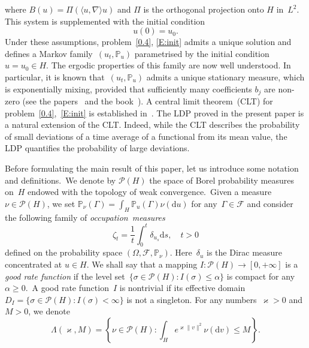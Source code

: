 \documentclass[10pt]{amsart}
\theoremstyle{definition}\newtheorem{defi}[theo]{Definition}\newtheorem{rema}[theo]{Remark}\newtheorem{exam}[theo]{Example}\newtheorem{exem}[theo]{Example}\newtheorem{nota}[theo]{Notation}
\newcommand{\IP}{{\mathbb P}}
\newcommand{\FF}{{\mathcal F}}
\newcommand{\PP}{{\mathcal P}}
\newcommand{\ty}{\infty}
\newcommand{\de}{\delta}
\newcommand{\dd}{\mathrm{d}}
\begin{document}
where $B(u)=\Pi(\langle u,\nabla \rangle u)$ and $\Pi$ is the orthogonal projection onto $H$ in~$L^2$. This system is supplemented with the initial condition
\begin{equation}\label{E:init}
u(0)=u_0.
\end{equation}
Under these assumptions, problem~\eqref{0.4}, \eqref{E:init} admits a unique solution and defines a Markov family~$(u_t,\IP_u)$ parametrised by the initial condition~$u=u_0 \in H$. The ergodic properties of this family are now well understood. In particular, it is known that~$(u_t,\IP_u)$ admits a unique stationary measure, which is exponentially mixing, provided that sufficiently many coefficients $b_j$ are non-zero (see the papers~\cite{FM-1995,KS-cmp2000,EMS-2001, KS-jmpa2002, BKL-2002,HM-2006, odasso-2008} and the book~\cite{KS-book}). A central limit theorem~(CLT) for problem~\eqref{0.4},~\eqref{E:init} is established in~\cite{kuksin-jmpa, shirikyan-ptrf}. The LDP proved in the present paper is a natural extension of the CLT. Indeed, while the CLT describes the probability of small deviations of a time average of a functional from its mean value, the LDP quantifies the probability of large deviations.


Before formulating the main result of this paper, let us introduce some notation and definitions.~We denote by $\PP(H)$ the space of Borel probability measures on~$H$ endowed with the to\-pology of weak convergence.~Given a measure~$\nu\in\PP(H)$, we set $
\IP_\nu(\Gamma)=\int_H\IP_u(\Gamma)\nu(\dd u)$ for any~$\Gamma\in \FF$ and consider the following family of \emph{occupation~measures}
\begin{equation}\label{0.5}
\zeta_t=\frac1t\int_{0}^{t}\delta_{u_s} \dd s,\quad t>0
\end{equation}
defined on the probability space $(\Omega,\FF,\IP_\nu)$. Here~$\de_u$ is the Dirac measure concentrated at $u\in H$. We shall say that a mapping $I : \PP(H) \to [0, +\ty]$ is a \emph{good rate function} if the level set~$\{\sigma\in\PP(H) : I(\sigma) \le \alpha \}$ is compact for any~$\alpha \ge0$.~A good rate function~$I$ is nontrivial if its effective domain $D_I = \{\sigma \in \PP(H) : I(\sigma) < \ty\}$ is not a singleton. For any numbers~$\varkappa>0$ and~$M>0$, we denote
\[
\Lambda(\varkappa,M)=\left\{\nu\in\PP(H):\int_He^{\varkappa\|v\|^2}\nu(\dd v)\le M \right\}.
\]
\end{document}
